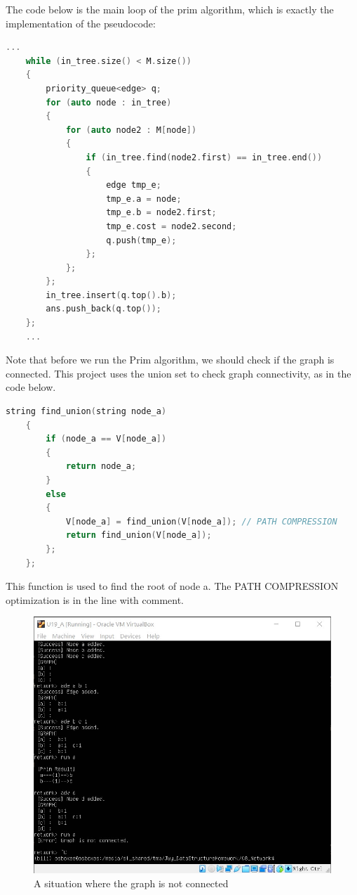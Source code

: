 \documentclass[cn,black,12pt,normal]{elegantnote}
\begin{document}
The code below is the main loop of the prim algorithm, which is exactly the implementation of the pseudocode:
\begin{lstlisting}[language = C++]
    ...
    while (in_tree.size() < M.size())
    {
        priority_queue<edge> q;
        for (auto node : in_tree)
        {
            for (auto node2 : M[node])
            {
                if (in_tree.find(node2.first) == in_tree.end())
                {
                    edge tmp_e;
                    tmp_e.a = node;
                    tmp_e.b = node2.first;
                    tmp_e.cost = node2.second;
                    q.push(tmp_e);
                };
            };
        };
        in_tree.insert(q.top().b);
        ans.push_back(q.top());
    };
    ...
\end{lstlisting}

Note that before we run the Prim algorithm, we should check if the graph is connected. This project uses the union set to check graph connectivity, as in the code below.

\begin{lstlisting}[language = C++]
	string find_union(string node_a)
	{
		if (node_a == V[node_a])
		{
			return node_a;
		}
		else
		{
			V[node_a] = find_union(V[node_a]); // PATH COMPRESSION
			return find_union(V[node_a]); 
		};
	};
\end{lstlisting}

This function is used to find the root of node a. The PATH COMPRESSION optimization is in the line with comment.

\begin{figure}[H]
    \centering
    \includegraphics[width=0.7\linewidth]{image/grid_04.jpg}
    \caption{A situation where the graph is not connected}
\end{figure}
\end{document}
